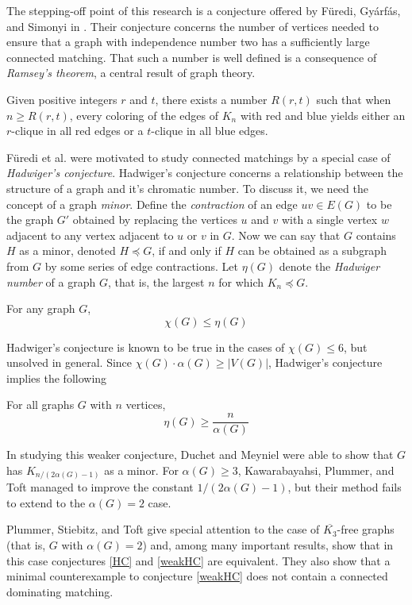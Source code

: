 
The stepping-off point of this research is a conjecture offered by F\"{u}redi, Gy{\'a}rf{\'a}s, and Simonyi in \cite{FGS}. Their conjecture concerns the number of vertices needed to ensure that a graph with independence number two has a sufficiently large connected matching.  That such a number is well defined is a consequence of \textit{Ramsey's theorem}, a central result of graph theory.
\begin{theorem}
	Given positive integers $r$ and $t$, there exists a number $R(r,t)$ such that when $n \geq R(r,t)$, every coloring of the edges of $K_n$ with red and blue yields either an $r$-clique in all red edges or a $t$-clique in all blue edges.    
\end{theorem}
F\"{u}redi et al. were motivated to study connected matchings by a special case of \textit{Hadwiger's conjecture}.  Hadwiger's conjecture concerns a relationship between the structure of a graph and it's chromatic number.  To discuss it, we need the concept of a graph \textit{minor}.  Define the \textit{contraction} of an edge $uv \in E(G)$ to be the graph $G'$ obtained by replacing the vertices $u$ and $v$ with a single vertex $w$ adjacent to any vertex adjacent to $u$ or $v$ in $G$.  Now we can say that $G$ contains $H$ as a minor, denoted $H \preceq G$, if and only if $H$ can be obtained as a subgraph from $G$ by some series of edge contractions.  Let $\eta(G)$ denote the \textit{Hadwiger number} of a graph $G$, that is, the largest $n$ for which $K_n \preceq G$.
\begin{conj}[Hadwiger (1947)]
	For any graph $G$, \[\chi(G) \leq \eta(G)\]\label{HC}
\end{conj}  
\noindent Hadwiger's conjecture is known to be true in the cases of $\chi(G) \leq 6$, but unsolved in general.
Since $\chi(G)\cdot\alpha(G) \geq |V(G)|$, Hadwiger's conjecture implies the following
\begin{conj}
 For all graphs $G$ with $n$ vertices, \[\eta(G) \geq \frac{n}{\alpha(G)}\]
\label{weakHC} 
\end{conj}In studying this weaker conjecture, Duchet and Meyniel \cite{DandM} were able to show that $G$ has $K_{n/(2\alpha(G)-1)}$ as a minor.  For $\alpha(G) \geq 3$, Kawarabayahsi, Plummer, and Toft \cite{DandMimprove} managed to improve the constant $1/(2\alpha(G)-1)$, but their method fails to extend to the $\alpha(G) = 2$ case.  

Plummer, Stiebitz, and Toft \cite{Spec_case} give special attention to the case of $\overline{K_3}$-free graphs (that is, $G$ with $\alpha(G) = 2$) and, among many important results, show that in this case conjectures \ref{HC} and \ref{weakHC} are equivalent.  They also show that a minimal counterexample to conjecture \ref{weakHC} does not contain a connected dominating matching.

